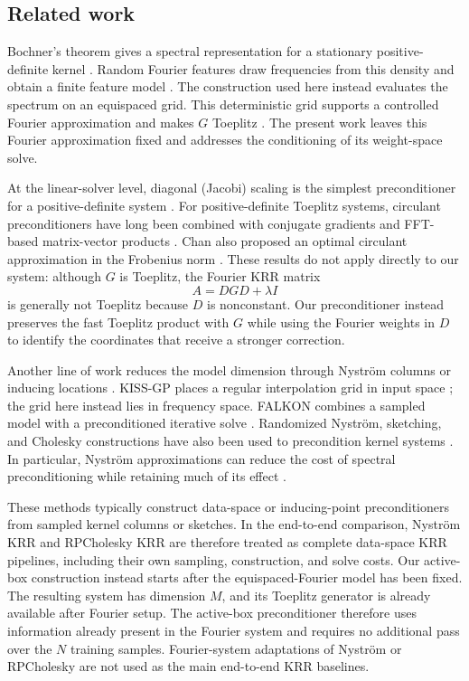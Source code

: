 \subsection{Related work}
\label{subsec:related-work}

Bochner's theorem gives a spectral representation for a stationary
positive-definite kernel
\cite{bochner1933monotone,wendland2004scattered}. Random Fourier features draw
frequencies from this density and obtain a finite feature model
\cite{rahimi2007random}. The construction used here instead evaluates the
spectrum on an equispaced grid. This deterministic grid supports a controlled
Fourier approximation and makes \(G\) Toeplitz
\cite{greengard2025efgp,barnett2024uniform}. The present work leaves this
Fourier approximation fixed and addresses the conditioning of its weight-space
solve.

At the linear-solver level, diagonal (Jacobi) scaling is the simplest
preconditioner for a positive-definite system \cite{saad2003iterative}.
For positive-definite Toeplitz systems, circulant preconditioners have
long been combined with conjugate gradients and FFT-based matrix-vector
products \cite{chan1989toeplitz}. Chan also proposed an optimal
circulant approximation in the Frobenius norm
\cite{chan1988optimal}. These results do not apply directly to our
system: although \(G\) is Toeplitz, the Fourier KRR matrix
\[
    A = DGD + \lambda I
\]
is generally not Toeplitz because \(D\) is nonconstant. Our
preconditioner instead preserves the fast Toeplitz product with \(G\)
while using the Fourier weights in \(D\) to identify the coordinates
that receive a stronger correction.


Another line of work reduces the model dimension through Nystr\"om
columns or inducing locations \cite{williams2001nystrom,titsias2009variational}.
KISS-GP places a regular interpolation grid in input space
\cite{wilson2015kissgp}; the grid here instead lies in frequency space.
FALKON combines a sampled model with a preconditioned iterative solve
\cite{rudi2017falkon,meanti2020kernelroof}. Randomized Nystr\"om, sketching,
and Cholesky constructions have also been used to precondition kernel
systems \cite{avron2017faster,frangella2023randomized,
chen2022rpcholesky,diaz2023robust}. In particular, Nystr\"om
approximations can reduce the cost of spectral preconditioning while
retaining much of its effect \cite{abedsoltan2024nystrom}.

These methods typically construct data-space or inducing-point
preconditioners from sampled kernel columns or sketches.  In the end-to-end
comparison, Nystr\"om KRR and RPCholesky KRR are therefore treated as complete
data-space KRR pipelines, including their own sampling, construction, and
solve costs.  Our active-box construction instead starts after the
equispaced-Fourier model has been fixed. The resulting system has dimension
\(M\), and its Toeplitz generator is already available after Fourier setup.
The active-box preconditioner therefore uses information already present in
the Fourier system and requires no additional pass over the \(N\) training
samples.  Fourier-system adaptations of Nystr\"om or RPCholesky are not used as
the main end-to-end KRR baselines.

